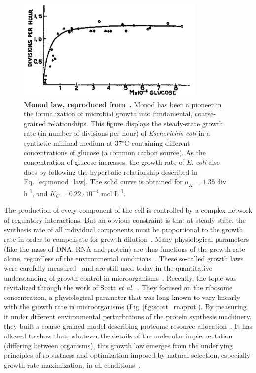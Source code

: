 \begin{figure}[tb]
\centering
\includegraphics[height=5cm]{./Fig/Chapter1/monod_law}
\caption{
\textbf{Monod law, reproduced from~\cite{monod_growth_1949}.}
Monod has been a pioneer in the formalization of microbial growth into fundamental, coarse-grained relationships.
This figure displays the steady-state growth rate (in number of divisions per hour) of \textit{Escherichia coli} in a synthetic minimal medium at 37$^{\circ}$C containing different concentrations of glucose (a common carbon source).
As the concentration of glucose increases, the growth rate of \textit{E. coli} also does by following the hyperbolic relationship described in Eq.~\ref{eq:monod_law}.
The solid curve is obtained for $\mu_K = 1.35$ div h\textsuperscript{-1}, and $K_C = 0.22 \cdot 10^{-4}$ mol L\textsuperscript{-1}.
}
\label{fig:monod_law}
\end{figure}

The production of every component of the cell is controlled by a complex network of regulatory interactions.
But an obvious constraint is that at steady state, the synthesis rate of all individual components must be proportional to the growth rate in order to compensate for growth dilution~\cite{monod_growth_1949}.
Many physiological parameters (like the mass of DNA, RNA and protein) are thus functions of the growth rate alone, regardless of the environmental conditions~\cite{schaechter_dependency_1958,bremer_modulation_1996}.
These so-called growth laws were carefully measured~\cite{bremer_modulation_1996} and are still used today in the quantitative understanding of growth control in microorganisms~\cite{ehrenberg_mediumdependent_2012}.
Recently, the topic was revitalized through the work of Scott \textit{et al.}~\cite{scott_bacterial_2011}.
They focused on the ribosome concentration, a physiological parameter that was long known to vary linearly with the growth rate in microorganisms (Fig~\ref{fig:scott_rnaprot}).
By measuring it under different environmental perturbations of the protein synthesis machinery, they built a coarse-grained model describing proteome resource allocation~\cite{scott_emergence_2014}.
It has allowed to show that, whatever the details of the molecular implementation (differing between organisms), this growth law emerges from the underlying principles of robustness and optimization imposed by natural selection, especially growth-rate maximization, in all conditions~\cite{scott_emergence_2014}.

